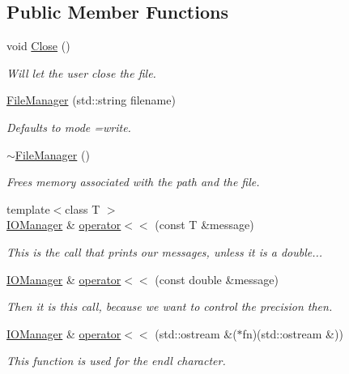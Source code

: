 \subsection*{Public Member Functions}
\begin{DoxyCompactItemize}
\item 
void \hyperlink{classJKBuilder_1_1FileManager_a7f7a3199c392465d0767c6506c1af5b4}{Close} ()
\begin{DoxyCompactList}\small\item\em Will let the user close the file. \item\end{DoxyCompactList}\item 
\hyperlink{classJKBuilder_1_1FileManager_ad2b836abb993359aa5ee2cdaaf647a7f}{FileManager} (std::string filename)
\begin{DoxyCompactList}\small\item\em Defaults to mode =write. \item\end{DoxyCompactList}\item 
\hyperlink{classJKBuilder_1_1FileManager_acb45faebe31bb3a16cf5bf9e031a8f08}{$\sim$FileManager} ()
\begin{DoxyCompactList}\small\item\em Frees memory associated with the path and the file. \item\end{DoxyCompactList}\item 
{\footnotesize template$<$class T $>$ }\\\hyperlink{classJKBuilder_1_1IOManager}{IOManager} \& \hyperlink{classJKBuilder_1_1IOManager_a505a35212a21e4884ed24b021c0add4b}{operator$<$$<$} (const T \&message)
\begin{DoxyCompactList}\small\item\em This is the call that prints our messages, unless it is a double... \item\end{DoxyCompactList}\item 
\hyperlink{classJKBuilder_1_1IOManager}{IOManager} \& \hyperlink{classJKBuilder_1_1IOManager_a127779d1803b6ffe9e44a3a36e46910e}{operator$<$$<$} (const double \&message)
\begin{DoxyCompactList}\small\item\em Then it is this call, because we want to control the precision then. \item\end{DoxyCompactList}\item 
\hyperlink{classJKBuilder_1_1IOManager}{IOManager} \& \hyperlink{classJKBuilder_1_1IOManager_a4ab394f377d37c6598659317320ec38c}{operator$<$$<$} (std::ostream \&($\ast$fn)(std::ostream \&))
\begin{DoxyCompactList}\small\item\em This function is used for the endl character. \item\end{DoxyCompactList}\end{DoxyCompactItemize}
